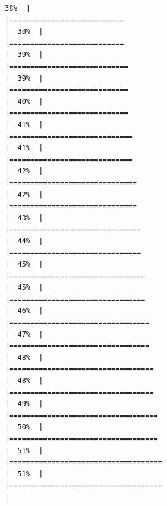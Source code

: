 \documentclass[
  english,
  man,a4paper,mask,floatsintext]{apa6}
\begin{document}
\begin{verbatim}
38%  |                                                                              |===========================                                           |  38%  |                                                                              |===========================                                           |  39%  |                                                                              |============================                                          |  39%  |                                                                              |============================                                          |  40%  |                                                                              |============================                                          |  41%  |                                                                              |=============================                                         |  41%  |                                                                              |=============================                                         |  42%  |                                                                              |==============================                                        |  42%  |                                                                              |==============================                                        |  43%  |                                                                              |===============================                                       |  44%  |                                                                              |===============================                                       |  45%  |                                                                              |================================                                      |  45%  |                                                                              |================================                                      |  46%  |                                                                              |=================================                                     |  47%  |                                                                              |=================================                                     |  48%  |                                                                              |==================================                                    |  48%  |                                                                              |==================================                                    |  49%  |                                                                              |===================================                                   |  50%  |                                                                              |===================================                                   |  51%  |                                                                              |====================================                                  |  51%  |                                                                              |====================================                                  |  
\end{verbatim}
\end{document}
